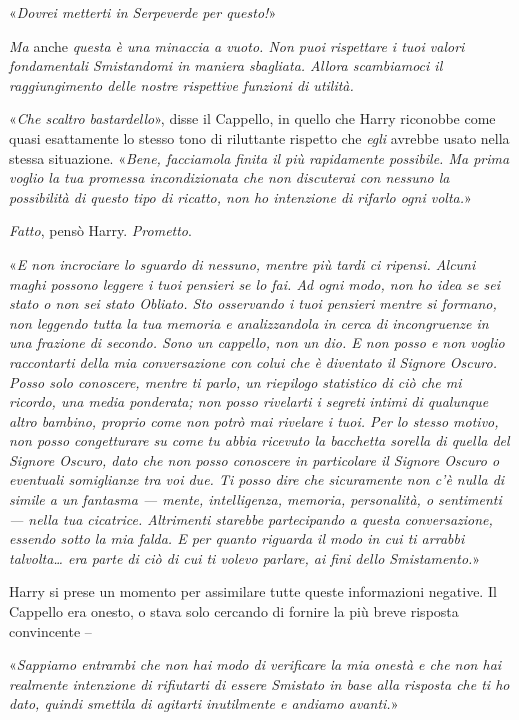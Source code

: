 «\textit{Dovrei metterti in Serpeverde per questo!}»

\textit{Ma} anche \textit{questa è una minaccia a vuoto. Non puoi rispettare i tuoi valori fondamentali Smistandomi in maniera sbagliata. Allora scambiamoci il raggiungimento delle nostre rispettive funzioni di utilità.}

«\textit{Che scaltro bastardello}», disse il Cappello, in quello che Harry riconobbe come quasi esattamente lo stesso tono di riluttante rispetto che \textit{egli} avrebbe usato nella stessa situazione. «\textit{Bene, facciamola finita il più rapidamente possibile. Ma prima voglio la tua promessa incondizionata che non discuterai con nessuno la possibilità di questo tipo di ricatto, non ho intenzione di rifarlo ogni volta.}»

\textit{Fatto}, pensò Harry. \textit{Prometto}.

«\textit{E non incrociare lo sguardo di nessuno, mentre più tardi ci ripensi. Alcuni maghi possono leggere i tuoi pensieri se lo fai. Ad ogni modo, non ho idea se sei stato o non sei stato Obliato. Sto osservando i tuoi pensieri mentre si formano, non leggendo tutta la tua memoria e analizzandola in cerca di incongruenze in una frazione di secondo. Sono un cappello, non un dio. E non posso e non voglio raccontarti della mia conversazione con colui che è diventato il Signore Oscuro. Posso solo conoscere, mentre ti parlo, un riepilogo statistico di ciò che mi ricordo, una media ponderata; non posso rivelarti i segreti intimi di qualunque altro bambino, proprio come non potrò mai rivelare i tuoi. Per lo stesso motivo, non posso congetturare su come tu abbia ricevuto la bacchetta sorella di quella del Signore Oscuro, dato che non posso conoscere in particolare il Signore Oscuro o eventuali somiglianze tra voi due. Ti posso dire che sicuramente non c’è nulla di simile a un fantasma — mente, intelligenza, memoria, personalità, o sentimenti — nella tua cicatrice. Altrimenti starebbe partecipando a questa conversazione, essendo sotto la mia falda. E per quanto riguarda il modo in cui ti arrabbi talvolta… era parte di ciò di cui ti volevo parlare, ai fini dello Smistamento.}»

Harry si prese un momento per assimilare tutte queste informazioni negative. Il Cappello era onesto, o stava solo cercando di fornire la più breve risposta convincente –

«\textit{Sappiamo entrambi che non hai modo di verificare la mia onestà e che non hai realmente intenzione di rifiutarti di essere Smistato in base alla risposta che ti ho dato, quindi smettila di agitarti inutilmente e andiamo avanti.}»

